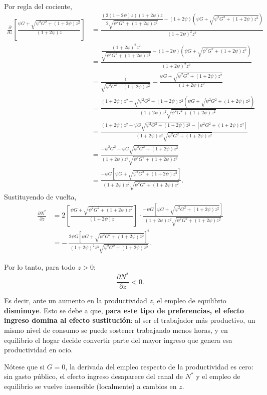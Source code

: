 \documentclass[11pt]{article}
\begin{document}
Por regla del cociente,
\begin{align*}
  \frac{\partial}{\partial z}\left[\frac{\psi G+\sqrt{\psi^2G^2+(1+2\psi)z^2}}{(1+2\psi)z}\right] &= \frac{\dfrac{(2(1+2\psi)z)(1+2\psi)z}{2\sqrt{\psi^2G^2+(1+2\psi)z^2}} - (1+2\psi) \left( \psi G+\sqrt{\psi^2G^2+(1+2\psi)z^2} \right)}{(1+2\psi)^2 z^2} \\[4pt]
  &= \frac{\dfrac{(1+2\psi)^2 z^2}{\sqrt{\psi^2G^2+(1+2\psi)z^2}} - (1+2\psi) \left( \psi G+\sqrt{\psi^2G^2+(1+2\psi)z^2} \right)}{(1+2\psi)^2 z^2} \\[4pt]
  &= \frac{1}{\sqrt{\psi^2G^2+(1+2\psi)z^2}} - \frac{ \psi G+\sqrt{\psi^2G^2+(1+2\psi)z^2} }{(1+2\psi) z^2} \\[4pt]
  &= \frac{(1+2\psi)z^2 - \sqrt{\psi^2G^2+(1+2\psi)z^2}\left(\psi G+\sqrt{\psi^2G^2+(1+2\psi)z^2}\right)}{(1+2\psi)z^2\sqrt{\psi^2G^2+(1+2\psi)z^2}} \\[4pt]
  &= \frac{(1+2\psi)z^2 - \psi G\sqrt{\psi^2G^2+(1+2\psi)z^2} - \left[\psi^2G^2+(1+2\psi)z^2\right]}{(1+2\psi)z^2\sqrt{\psi^2G^2+(1+2\psi)z^2}} \\[4pt]
  &= \frac{-\psi^2G^2 - \psi G\sqrt{\psi^2G^2+(1+2\psi)z^2}}{(1+2\psi)z^2\sqrt{\psi^2G^2+(1+2\psi)z^2}} \\[4pt]
  &= \frac{-\psi G\left[\psi G+\sqrt{\psi^2G^2+(1+2\psi)z^2}\right]}{(1+2\psi)z^2\sqrt{\psi^2G^2+(1+2\psi)z^2}}.
\end{align*}
Sustituyendo de vuelta,
\begin{align*}
  \frac{\partial N^*}{\partial z}
  &= 2 \left[\frac{\psi G+\sqrt{\psi^2G^2+(1+2\psi)z^2}}{(1+2\psi)z}\right] \cdot \frac{-\psi G\left[\psi G+\sqrt{\psi^2G^2+(1+2\psi)z^2}\right]}{(1+2\psi)z^2\sqrt{\psi^2G^2+(1+2\psi)z^2}} \\[4pt]
  &= -\,\frac{2\psi G\left[\psi G+\sqrt{\psi^2G^2+(1+2\psi)z^2}\right]^2}{(1+2\psi)^2 z^3 \sqrt{\psi^2G^2+(1+2\psi)z^2}}.
\end{align*}


Por lo tanto, para todo $z>0$:
\[
\boxed{
  \frac{\partial N^*}{\partial z} < 0
}.
\]

Es decir, ante un aumento en la productividad $z$, el empleo de equilibrio \textbf{disminuye}. Esto se debe a que, \textbf{para este tipo de preferencias, el efecto ingreso domina al efecto sustitución}: al ser el trabajador más productivo, un mismo nivel de consumo se puede sostener trabajando menos horas, y en equilibrio el hogar decide convertir parte del mayor ingreso que genera esa productividad en ocio.

Nótese que si $G=0$, la derivada del empleo respecto de la productividad es cero: sin gasto público, el efecto ingreso desaparece del canal de $N^*$ y el empleo de equilibrio se vuelve insensible (localmente) a cambios en $z$.
\end{document}
